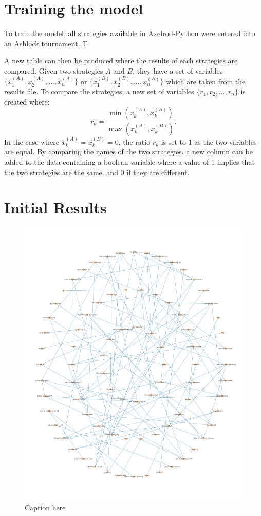 \section{Training the model}\label{sec:training_model}

To train the model, all strategies available in Axelrod-Python were entered into an Ashlock tournament.
T

A new table can then be produced where the results of each strategies are compared.
Given two strategies $A$ and $B$, they have a set of variables $\{x_1^{(A)}, x_2^{(A)}, \dots, x_n^{(A)}\}$ or $\{x_1^{(B)}, x_2^{(B)}, \dots, x_n^{(B)}\}$ which are taken from the results file.
To compare the strategies, a new set of variables $\{r_1, r_2, \dots, r_n \}$ is created where:
$$
r_k = \frac{\min(x_k^{(A)}, x_k^{(B)})}{\max(x_k^{(A)}, x_k^{(B)})}.
$$
In the case where $x_k^{(A)} = x_k^{(B)} = 0$, the ratio $r_k$ is set to 1 as the two variables are equal.
By comparing the names of the two strategies, a new column can be added to the data containing a boolean variable where a value of 1 implies that the two strategies are the same, and 0 if they are different.


\section{Initial Results}

\begin{figure}[htbp!]
    \centering
    \includegraphics[width=\linewidth]{../img/neighbourhoods/overall.png}
    \caption{Caption here}
    \label{fig:figure1}
\end{figure}

